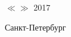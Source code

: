 \begin{titlepage}
    \begin{flushright}
        $\ll$\underline{\hspace{0.5cm}}$\gg$ \underline{\hspace{1.5cm}} 2017
    \end{flushright}

	\vfill

	\begin{center}
	    Санкт-Петербург\\
	    \the\year
	\end{center}

\end{titlepage}